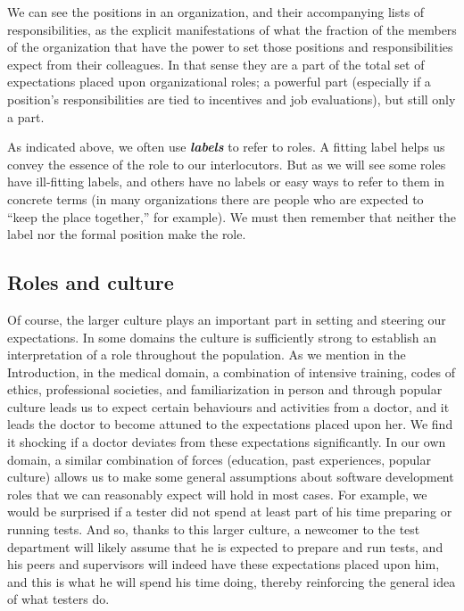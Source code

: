 \documentclass[10pt, conference, compsocconf]{IEEEtran}
\begin{document}
We can see the positions in an organization, and their accompanying lists of responsibilities, as the explicit manifestations of what the fraction of the members of the organization that have the power to set those positions and responsibilities expect from their colleagues. In that sense they are a part of the total set of expectations placed upon organizational roles; a powerful part (especially if a position's responsibilities are tied to incentives and job evaluations), but still only a part.

As indicated above, we often use \textbf{\emph{labels}} to refer to roles. A fitting label helps us convey the essence of the role to our interlocutors. But as we will see some roles have ill-fitting labels, and others have no labels or easy ways to refer to them in concrete terms (in many organizations there are people who are expected to ``keep the place together,'' for example). We must then remember that neither the label nor the formal position make the role. 


\subsection{Roles and culture}

Of course, the larger culture plays an important part in setting and steering our expectations. In some domains the culture is sufficiently strong to establish an interpretation of a role throughout the population. As we mention in the Introduction, in the medical domain, a combination of intensive training, codes of ethics, professional societies, and familiarization in person and through popular culture leads us to expect certain behaviours and activities from a doctor, and it leads the doctor to become attuned to the expectations placed upon her. We find it shocking if a doctor deviates from these expectations significantly. In our own domain, a similar combination of forces (education, past experiences, popular culture) allows us to make some general assumptions about software development roles that we can reasonably expect will hold in most cases. For example, we would be surprised if a tester did not spend at least part of his time preparing or running tests. And so, thanks to this larger culture, a newcomer to the test department will likely assume that he is expected to prepare and run tests, and his peers and supervisors will indeed have these expectations placed upon him, and this is what he will spend his time doing, thereby reinforcing the general idea of what testers do.
\end{document}
